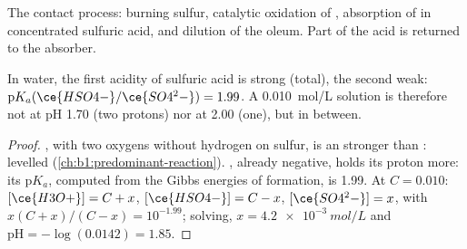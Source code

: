 \begin{omfigure}

{\small The contact process: burning sulfur, catalytic oxidation of
, absorption of  in concentrated sulfuric acid, and
dilution of the oleum. Part of the acid is returned to the absorber.}
\end{omfigure}

\begin{proposition}\label{prop:b1:p-block-16-18:sulfuric-strength}
In water, the first acidity of sulfuric acid is strong (total), the
second weak: $\mathrm{p}K_a(\ce{HSO4-}/\ce{SO4^2-}) = 1.99$. A
\qty{0.010}{mol/L} solution is therefore not at pH 1.70 (two protons) nor
at 2.00 (one), but in between.
\end{proposition}

\begin{proof}
, with two oxygens without hydrogen on sulfur, is an 
stronger than : levelled (\cref{ch:b1:predominant-reaction}).
, already negative, holds its proton more: its $\mathrm{p}K_a$,
computed from the Gibbs energies of formation, is 1.99. At $C = 0.010$:
$[\ce{H3O+}] = C + x$, $[\ce{HSO4-}] = C - x$, $[\ce{SO4^2-}] = x$, with
$x(C + x)/(C - x) = 10^{-1.99}$; solving, $x = \qty{4.2e-3}{mol/L}$ and
$\mathrm{pH} = -\log(0.0142) = 1.85$.
\end{proof}

